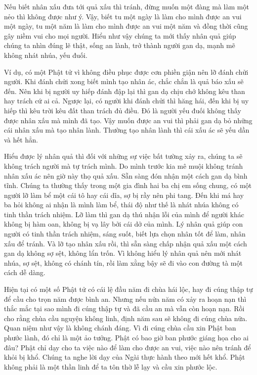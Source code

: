 \documentclass[
  12pt,
  oneside]{book}
\begin{document}
Nếu biết nhân xấu đưa tới quả xấu thì tránh, đừng muốn một đàng mà làm một nẻo thì không được như ý. Vậy, biết tu một ngày là làm cho mình được an vui một ngày, tu một năm là làm cho mình được an vui một năm và đồng thời cũng gây niềm vui cho mọi người. Hiểu như vậy chúng ta mới thấy nhân quả giúp chúng ta nhìn đúng lẽ thật, sống an lành, trở thành người gan dạ, mạnh mẽ không nhát nhúa, yếu đuối.

Ví dụ, có một Phật tử vì không điều phục được cơn phiền giận nên lỡ đánh chửi người. Khi đánh chửi xong biết mình tạo nhân ác, chắc chắn là quả báo xấu sẽ đến. Nên khi bị người uy hiếp đánh đập lại thì gan dạ chịu chớ không kêu than hay trách cứ ai cả. Ngược lại, có người khi đánh chửi thì hăng hái, đến khi bị uy hiếp thì kêu trời kêu đất than trách đủ điều. Đó là người yếu đuối không thấy được nhân xấu mà mình đã tạo. Vậy muốn được an vui thì phải gan dạ bỏ những cái nhân xấu mà tạo nhân lành. Thường tạo nhân lành thì cái xấu ác sẽ yếu dần và hết hẳn.

Hiểu được lý nhân quả thì đối với những sự việc bất tường xảy ra, chúng ta sẽ không trách người mà tự trách mình. Do mình trước kia mê muội không tránh nhân xấu ác nên giờ này thọ quả xấu. Sẵn sàng đón nhận một cách gan dạ bình tĩnh. Chúng ta thường thấy trong một gia đình hai ba chị em sống chung, có một người lỡ làm bể một cái tô hay cái dĩa, sợ bị rầy nên phi tang. Đến khi má hay ba hỏi không ai nhận là mình làm bể, thái độ như thế là nhát nhúa không có tinh thần trách nhiệm. Lỡ làm thì gan dạ thú nhận lỗi của mình để người khác không bị hàm oan, không bị vạ lây bởi cái dở của mình. Lý nhân quả giúp con người có tinh thần trách nhiệm, sáng suốt, biết lựa chọn nhân tốt để làm, nhân xấu để tránh. Và lỡ tạo nhân xấu rồi, thì sẵn sàng chấp nhận quả xấu một cách gan dạ không sợ sệt, không lẩn trốn. Vì không hiểu lý nhân quả nên mới nhát nhúa, sợ sệt, không có chánh tín, rồi làm xằng bậy sẽ đi vào con đường tà một cách dễ dàng.

Hiện tại có một số Phật tử có cái lệ đầu năm đi chùa hái lộc, hay đi cúng thập tự để cầu cho trọn năm được bình an. Nhưng nếu nửa năm có xảy ra hoạn nạn thì thắc mắc tại sao mình đi cúng thập tự và đã cầu an mà vẫn còn hoạn nạn. Rồi cho rằng chùa cầu nguyện không linh, định năm sau sẽ không đi cúng chùa nữa. Quan niệm như vậy là không chánh đáng. Vì đi cúng chùa cầu xin Phật ban phước lành, đó chỉ là một ảo tưởng. Phật có bao giờ ban phước giáng họa cho ai đâu? Phật chỉ dạy cho ta việc nào để làm cho được an vui, việc nào nên tránh để khỏi bị khổ. Chúng ta nghe lời dạy của Ngài thực hành theo mới hết khổ. Phật không phải là một thần linh để ta tôn thờ lễ lạy và cầu xin phước lộc.
\end{document}
